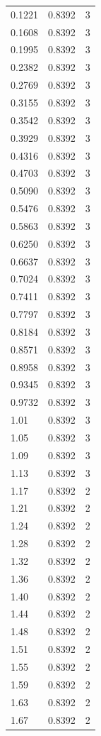 \begin{longtable}{lrr}
  0.1221 & 0.8392 & 3 \\
  0.1608 & 0.8392 & 3 \\
  0.1995 & 0.8392 & 3 \\
  0.2382 & 0.8392 & 3 \\
  0.2769 & 0.8392 & 3 \\
  0.3155 & 0.8392 & 3 \\
  0.3542 & 0.8392 & 3 \\
  0.3929 & 0.8392 & 3 \\
  0.4316 & 0.8392 & 3 \\
  0.4703 & 0.8392 & 3 \\
  0.5090 & 0.8392 & 3 \\
  0.5476 & 0.8392 & 3 \\
  0.5863 & 0.8392 & 3 \\
  0.6250 & 0.8392 & 3 \\
  0.6637 & 0.8392 & 3 \\
  0.7024 & 0.8392 & 3 \\
  0.7411 & 0.8392 & 3 \\
  0.7797 & 0.8392 & 3 \\
  0.8184 & 0.8392 & 3 \\
  0.8571 & 0.8392 & 3 \\
  0.8958 & 0.8392 & 3 \\
  0.9345 & 0.8392 & 3 \\
  0.9732 & 0.8392 & 3 \\
  1.01 & 0.8392 & 3 \\
  1.05 & 0.8392 & 3 \\
  1.09 & 0.8392 & 3 \\
  1.13 & 0.8392 & 3 \\
  1.17 & 0.8392 & 2 \\
  1.21 & 0.8392 & 2 \\
  1.24 & 0.8392 & 2 \\
  1.28 & 0.8392 & 2 \\
  1.32 & 0.8392 & 2 \\
  1.36 & 0.8392 & 2 \\
  1.40 & 0.8392 & 2 \\
  1.44 & 0.8392 & 2 \\
  1.48 & 0.8392 & 2 \\
  1.51 & 0.8392 & 2 \\
  1.55 & 0.8392 & 2 \\
  1.59 & 0.8392 & 2 \\
  1.63 & 0.8392 & 2 \\
  1.67 & 0.8392 & 2 \\

\end{longtable}
